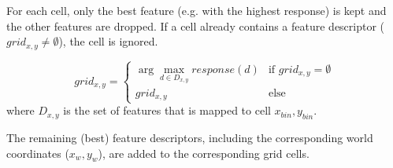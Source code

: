 For each cell, only the best feature (e.g. with the highest response) is kept and the other features are dropped.
If a cell already contains a feature descriptor ($grid_{x,y} \neq \emptyset$), the cell is ignored.

\begin{equation}
grid_{x,y} = 
\begin{cases}
\arg\max_{d \in D_{x,y}} response(d) & \mbox{if }  grid_{x,y} = \emptyset \\
grid_{x,y}   &   \mbox{else}
\end{cases} 
\end{equation}
where $D_{x,y}$ is the set of features that is mapped to cell $x_{bin} ,y_{bin}$.

The remaining (best) feature descriptors, including the corresponding world coordinates ($x_w, y_w$), are added to the corresponding grid cells.

